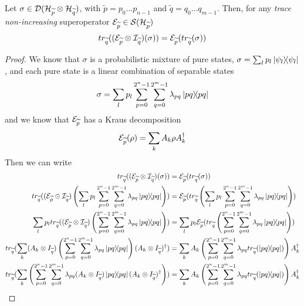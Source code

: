 \begin{lemma}\label{trace_and_sop}
Let $\sigma \in  \mathcal{D}(\mathcal{H}_{\widetilde{p}} \otimes \mathcal{H}_{\widetilde{q}})$, with $\widetilde{p} = p_0 \ldots p_{n-1}$ and $\widetilde{q} = q_0 \ldots q_{m-1}$. Then, for any \textit{trace non-increasing} superoperator $\mathcal{E}_{\widetilde{p}} \in \mathcal{S}(\mathcal{H}_{\widetilde{p}})$
\[ tr_{\widetilde{q}}((\mathcal{E}_{\widetilde{p}} \otimes \mathcal{I}_{\widetilde{q}})(\sigma)) = \mathcal{E}_{\widetilde{p}}(tr_{\widetilde{q}}(\sigma))
\]
\end{lemma}
\begin{proof}
We know that $\sigma$ is a probabilistic mixture of pure states, $\sigma = \sum_l p_l \ket{\psi_l}\!\!\bra{\psi_l}$, and each pure state is a linear combination of separable states 
\[\sigma = \sum_l p_l \sum_{p = 0}^{2^n-1} \sum_{q = 0}^{2^m-1} \lambda_{pq} \ket{pq}\!\!\bra{pq}\]
and we know that $\mathcal{E}_{\widetilde{p}}$ has a Kraus decomposition 
\[\mathcal{E}_{\widetilde{p}}(\rho) = \sum_k A_k \rho A_k^\dagger\]
Then we can write 
\hspace*{-2cm}\begin{align*}
\trQ((\sop_{\widetilde{p}} \otimes \mathcal{I}_{\widetilde{q}})(\sigma)) &= \sop_{\widetilde{p}}(\trQ(\sigma)) 
\\ 
\trQ((\sop_{\widetilde{p}} \otimes \mathcal{I}_{\widetilde{q}})\left(\sum_l p_l \sum_{p = 0}^{2^n-1} \sum_{q = 0}^{2^m-1} \lambda_{pq} \proj{pq}\right)) &= \sop_{\widetilde{p}}(\trQ\left(\sum_l p_l \sum_{p = 0}^{2^n-1} \sum_{q = 0}^{2^m-1} \lambda_{pq} \proj{pq}\right))
\\
\sum_l p_l \trQ((\sop_{\widetilde{p}} \otimes \mathcal{I}_{\widetilde{q}})\left( \sum_{p = 0}^{2^n-1} \sum_{q = 0}^{2^m-1} \lambda_{pq} \proj{pq}\right)) 
&= \sum_l p_l \sop_{\widetilde{p}}(\trQ\left( \sum_{p = 0}^{2^n-1} \sum_{q = 0}^{2^m-1} \lambda_{pq} \proj{pq}\right))
\\
\trQ(\sum_k (A_k \otimes I_{\widetilde{q}})\left( \sum_{p = 0}^{2^n-1} \sum_{q = 0}^{2^m-1} \lambda_{pq} \proj{pq}\right)(A_k \otimes I_{\widetilde{q}})^\dagger )
&= \sum_k A_k\left( \sum_{p = 0}^{2^n-1} \sum_{q = 0}^{2^m-1} \lambda_{pq} \trQ(\proj{pq})\right) A_k^\dagger 
\\
\trQ(\sum_k  \left( \sum_{p = 0}^{2^n-1} \sum_{q = 0}^{2^m-1} \lambda_{pq} (A_k \otimes I_{\widetilde{q}}) \proj{pq} (A_k \otimes I_{\widetilde{q}})^\dagger  \right) )
&= \sum_k A_k\left( \sum_{p = 0}^{2^n-1} \sum_{q = 0}^{2^m-1} \lambda_{pq} \trQ(\proj{pq})\right) A_k^\dagger
\\

\end{align*}
\end{proof}
